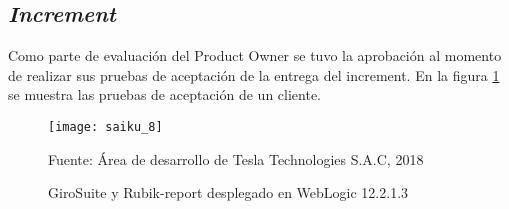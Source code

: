\begin{spacing}{1.5}
	\subsection{\textit{Increment}}
	Como parte de evaluaci\'{o}n del Product Owner se tuvo la aprobaci\'{o}n al momento de realizar sus pruebas de aceptaci\'{o}n de la entrega del increment.
	En la figura \ref{figure:chaperIII_11} se muestra las pruebas de aceptaci\'{o}n de un cliente.
	
	\begin{figure}[H]
		\centering
		\texttt{[image: saiku\_8]}
		\caption {\centering \small{GiroSuite y Rubik-report desplegado en WebLogic 12.2.1.3}} \label{figure:chaperIII_11}
		\small {Fuente: \'{A}rea de desarrollo de Tesla Technologies S.A.C, 2018}
	\end{figure}
	
	
	
	
	
\end{spacing}